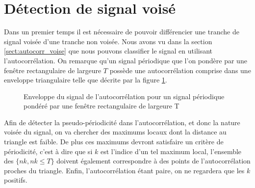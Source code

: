 \documentclass[french]{article}
\begin{document}
\section{Détection de signal voisé}

Dans un premier temps il est nécessaire de pouvoir différencier une tranche de signal voisée d'une tranche non voisée. Nous avons vu dans la section \ref{sect:autocorr_voise} que nous pouvons classifier le signal en utilisant l'autocorrélation. On remarque qu'un signal périodique que l'on pondère par une fenêtre rectangulaire de largeure $T$ possède une autocorrélation comprise dans une enveloppe triangulaire telle que décrite par la figure \ref{fig:enveloppe}.

\begin{figure}[h!]
	\centering
	\caption[Enveloppe de l'autocorrélation]{Enveloppe du signal de l'autocorrélation pour un signal périodique pondéré par une fenêtre rectangulaire de largeure T}
	\label{fig:enveloppe}
\end{figure}

Afin de détecter la pseudo-périodicité dans l'autocorrélation, et donc la nature voisée du signal, on va chercher des maximums locaux dont la distance au triangle est faible. De plus ces maximums devront satisfaire un critère de périodicité, c'est à dire que si $k$ est l'indice d'un tel maximum local, l'ensemble des $\{nk, nk \leq T\}$ doivent également correspondre à des points de l'autocorrélation proches du triangle. Enfin, l'autocorrélation étant paire, on ne regardera que les $k$ positifs.
\end{document}
